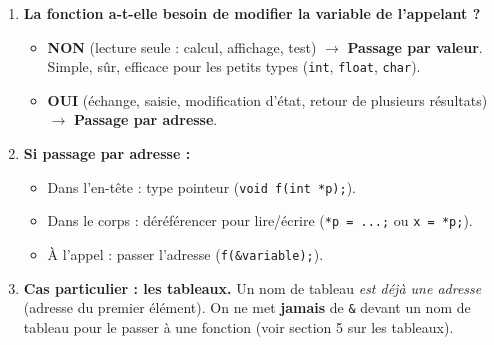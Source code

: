 \documentclass[11pt]{article}
\begin{document}
\begin{methode}
\begin{enumerate}
    \item \textbf{La fonction a-t-elle besoin de modifier la variable de l'appelant ?}
        \begin{itemize}
            \item \textbf{NON} (lecture seule : calcul, affichage, test) $\rightarrow$ \textbf{Passage par valeur}. Simple, sûr, efficace pour les petits types (\texttt{int}, \texttt{float}, \texttt{char}).
            \item \textbf{OUI} (échange, saisie, modification d'état, retour de plusieurs résultats) $\rightarrow$ \textbf{Passage par adresse}.
        \end{itemize}
    \item \textbf{Si passage par adresse :}
        \begin{itemize}
            \item Dans l'en-tête : type pointeur (\texttt{void f(int *p);}).
            \item Dans le corps : déréférencer pour lire/écrire (\texttt{*p = ...;} ou \texttt{x = *p;}).
            \item À l'appel : passer l'adresse (\texttt{f(\&variable);}).
        \end{itemize}
    \item \textbf{Cas particulier : les tableaux.} Un nom de tableau \emph{est déjà une adresse} (adresse du premier élément). On ne met \textbf{jamais} de \texttt{\&} devant un nom de tableau pour le passer à une fonction (voir section 5 sur les tableaux).
\end{enumerate}
\end{methode}
\end{document}
